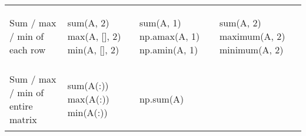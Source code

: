 \documentclass[10pt, landscape]{article}
\newenvironment{Shaded}{}{}
\newcommand{\DecValTok}[1]{\textcolor[rgb]{0.25,0.63,0.44}{{#1}}}
\newcommand{\FloatTok}[1]{\textcolor[rgb]{0.25,0.63,0.44}{{#1}}}
\newcommand{\BuiltInTok}[1]{{#1}}
\newcommand{\NormalTok}[1]{{#1}}
\begin{document}
\begin{multicols}{2}
\begin{tabular}[ ]{@{}llll@{}}
\begin{minipage}[t]{0.23\columnwidth}
Sum / max / min of each row\strut
\end{minipage} & \begin{minipage}[t]{0.22\columnwidth}\raggedright\strut
\begin{Shaded}
\begin{Highlighting}[]
\NormalTok{sum(A, }\FloatTok{2}\NormalTok{)}
\NormalTok{max(A, [], }\FloatTok{2}\NormalTok{)}
\NormalTok{min(A, [], }\FloatTok{2}\NormalTok{)}
\end{Highlighting}
\end{Shaded}
\strut
\end{minipage} & \begin{minipage}[t]{0.24\columnwidth}\raggedright\strut
\begin{Shaded}
\begin{Highlighting}[]
\BuiltInTok{sum}\NormalTok{(A, }\DecValTok{1}\NormalTok{)}
\NormalTok{np.amax(A, }\DecValTok{1}\NormalTok{)}
\NormalTok{np.amin(A, }\DecValTok{1}\NormalTok{)}
\end{Highlighting}
\end{Shaded}
\strut
\end{minipage} & \begin{minipage}[t]{0.20\columnwidth}\raggedright\strut
\begin{Shaded}
\begin{Highlighting}[]
\NormalTok{sum(A, }\FloatTok{2}\NormalTok{)}
\NormalTok{maximum(A, }\FloatTok{2}\NormalTok{)}
\NormalTok{minimum(A, }\FloatTok{2}\NormalTok{)}
\end{Highlighting}
\end{Shaded}
\strut
\end{minipage}\tabularnewline
\begin{minipage}[t]{0.23\columnwidth}\raggedright\strut
Sum / max / min of entire matrix\strut
\end{minipage} & \begin{minipage}[t]{0.22\columnwidth}\raggedright\strut
\begin{Shaded}
\begin{Highlighting}[]
\NormalTok{sum(A(:))}
\NormalTok{max(A(:))}
\NormalTok{min(A(:))}
\end{Highlighting}
\end{Shaded}
\strut
\end{minipage} & \begin{minipage}[t]{0.24\columnwidth}\raggedright\strut
\begin{Shaded}
\begin{Highlighting}[]
\NormalTok{np.}\BuiltInTok{sum}\NormalTok{(A)}

\end{Highlighting}
\end{Shaded}
\end{minipage}
\end{tabular}
\end{multicols}
\end{document}
